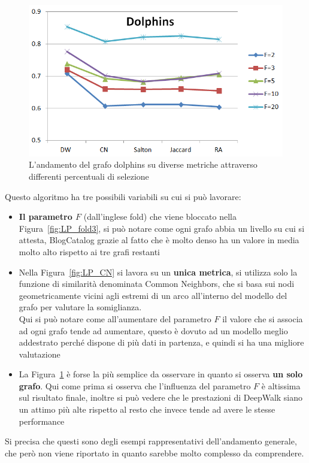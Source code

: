 %
\begin{figure}[htp]
	\centering
	\includegraphics[width=\linewidth]{immagini/LP_Dolphins}
	\caption{L'andamento del grafo dolphins su diverse metriche attraverso differenti percentuali di selezione}
	\label{fig:LP_Dolphins}
\end{figure}
%
Questo algoritmo ha tre possibili variabili su cui si può lavorare:
\begin{itemize}
	\item \textbf{Il parametro $F$} (dall'inglese fold) che viene bloccato nella Figura~\ref{fig:LP_fold3}, si può notare come ogni grafo abbia un livello su cui si attesta, BlogCatalog grazie al fatto che è molto denso ha un valore in media molto alto rispetto ai tre grafi restanti
	\item Nella Figura~\ref{fig:LP_CN} si lavora su un \textbf{unica metrica}, si utilizza solo la funzione di similarità denominata Common Neighbors, che si basa sui nodi geometricamente vicini agli estremi di un arco all'interno del modello del grafo per valutare la somiglianza.\\
	Qui si può notare come all'aumentare del parametro $F$ il valore che si associa ad ogni grafo tende ad aumentare, questo è dovuto ad un modello meglio addestrato perché dispone di più dati in partenza, e quindi si ha una migliore valutazione
	\item La Figura~\ref{fig:LP_Dolphins} è forse la più semplice da osservare in quanto si osserva \textbf{un solo grafo}. Qui come prima si osserva che l'influenza del parametro $F$ è altissima sul risultato finale, inoltre si può vedere che le prestazioni di DeepWalk siano un attimo più alte rispetto al resto che invece tende ad avere le stesse performance 
\end{itemize}
Si precisa che questi sono degli esempi rappresentativi dell'andamento generale, che però non viene riportato in quanto sarebbe molto complesso da comprendere.
%
